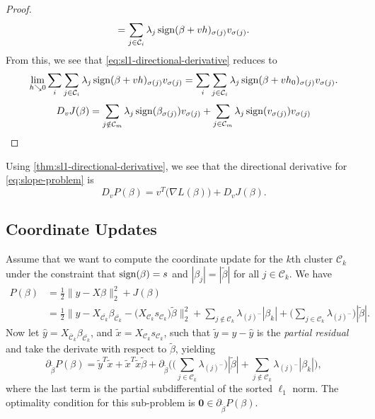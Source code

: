 \begin{proof}
\[    = \sum_{j \in \mathcal{C}_i} \lambda_j\operatorname{sign}(\beta + vh)_{\sigma(j)}v_{\sigma(j)}.
  \]
  From this, we see that \eqref{eq:sl1-directional-derivative} reduces to
  \[
    \lim_{h \searrow 0} \sum_i \sum_{j \in \mathcal{C}_i} \lambda_j\operatorname{sign}(\beta + vh)_{\sigma(j)}v_{\sigma(j)}
    = \sum_i \sum_{j \in \mathcal{C}_i} \lambda_j\operatorname{sign}(\beta + vh_0)_{\sigma(j)}v_{\sigma(j)}.
  \]
  \begin{equation*}
    D_v J(\beta) = \sum_{j \notin \mathcal{C}_m} \lambda_j \operatorname{sign} (\beta_{\sigma(j)}) v_{\sigma(j)}
      +
    \sum_{j \in \mathcal{C}_m} \lambda_j \operatorname{sign} (v_{\sigma(j)}) v_{\sigma(j)}
  \end{equation*}
\end{proof}

\begin{remark}
  Using \cref{thm:sl1-directional-derivative}, we see that
  the directional derivative for \eqref{eq:slope-problem} is
  \[
    D_v P(\beta) = v^T \big(\nabla L(\beta)\big) + D_v J(\beta).
  \]
\end{remark}

\subsection{Coordinate Updates}%
\label{sec:coordinate-updates}

Assume that we want to compute the coordinate update for the \(k\)th cluster
\(\mathcal{C}_k\) under the constraint that \(\operatorname{sign}(\beta) = s\) and
\(|\beta_j| = |\tilde \beta|\) for all \(j \in \mathcal{C}_k\).
We have
\[
  \begin{aligned}
    P(\beta) & =  \frac{1}{2} \lVert y - X\beta\rVert_2^2 + J(\beta)                                                                                                                                                                                                                                   \\
             & = \frac{1}{2} \lVert y - X_{\bar{\mathcal{C}_k}} \beta_{\bar{\mathcal{C}_k}} - \big(X_{\mathcal{C}_k} s_{\mathcal{C}_k}\big)\tilde\beta  \rVert_2^2 + \sum_{j \notin {\mathcal{C}_k}} \lambda_{(j)^-}|\beta_k| + \bigg(\sum_{j \in {\mathcal{C}_k}} \lambda_{(j)^-}\bigg)|\tilde\beta|.
  \end{aligned}
\]
Now let \(\hat y = X_{\bar{\mathcal{C}}_k} \beta_{\bar{\mathcal{C}_k}}\), and $ \tilde x = X_{\mathcal{C}_k} s_{\mathcal{C}_k}$,
such that \(\tilde y = y - \hat y\) is the \emph{partial residual} and take the
derivate with respect to \(\tilde\beta\), yielding
\begin{equation}
  \label{eq:cluster-grad}
  \partial_{\tilde\beta}
  P(\beta) = \tilde y^T \tilde x + \tilde x^T \tilde x \tilde\beta + \partial_{\tilde\beta}\Bigg(\bigg(\sum_{j \in {\mathcal{C}_k}} \lambda_{(j)^-}\bigg)|\tilde\beta| + \sum_{j \notin \mathcal{C}_k}\lambda_{(j)^-}|\beta_k|\Bigg),
\end{equation}
where the last term is the partial subdifferential of the sorted \(\ell_1\)
norm.
The optimality condition for this sub-problem is \(\boldsymbol{0} \in
\partial_{\tilde \beta} P(\beta).
\)

